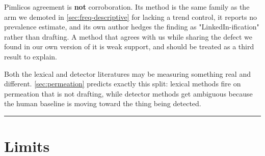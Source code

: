 Pimlico\cite{pimlico2025}\textquotesingle s agreement is \textbf{not} corroboration. Its method is the same family as
the arm we demoted in \cref{sec:freq-descriptive} for lacking a trend control, it reports no
prevalence estimate, and its own author hedges the finding as
"LinkedIn-ification" rather than drafting. A method that agrees with us while
sharing the defect we found in our own version of it is weak support, and
should be treated as a third result to explain.

Both the lexical and detector literatures may be measuring something real and
different. \cref{sec:permeation} predicts exactly this split: lexical methods fire on permeation
that is not drafting, while detector methods get ambiguous because the human
baseline is moving toward the thing being detected.

\begin{center}\rule{0.5\linewidth}{0.5pt}\end{center}

\section{Limits}\label{sec:limits}

